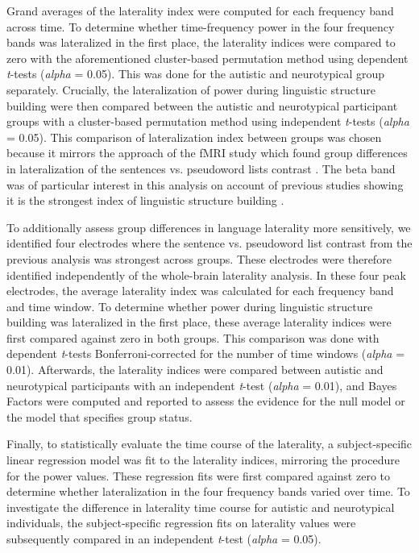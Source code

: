 Grand averages of the laterality index were computed for each frequency band across time. To determine whether time-frequency power in the four frequency bands was lateralized in the first place, the laterality indices were compared to zero with the aforementioned cluster-based permutation method using dependent \textit{t}-tests (\textit{alpha} = 0.05). This was done for the autistic and neurotypical group separately. Crucially, the lateralization of power during linguistic structure building were then compared between the autistic and neurotypical participant groups with a cluster-based permutation method using independent \textit{t}-tests (\textit{alpha} = 0.05). This comparison of lateralization index between groups was chosen because it mirrors the approach of the fMRI study which found group differences in lateralization of the sentences vs. pseudoword lists contrast \citep{jouravlev2020}. The beta band was of particular interest in this analysis on account of previous studies showing it is the strongest index of linguistic structure building \citep{bastiaansen2010,bastiaansen2015}. 

To additionally assess group differences in language laterality more sensitively, we identified four electrodes where the sentence vs. pseudoword list contrast from the previous analysis was strongest across groups. These electrodes were therefore identified independently of the whole-brain laterality analysis. In these four peak electrodes, the average laterality index was calculated for each frequency band and time window. To determine whether power during linguistic structure building was lateralized in the first place, these average laterality indices were first compared against zero in both groups. This comparison was done with dependent \textit{t}-tests Bonferroni-corrected for the number of time windows (\textit{alpha} = 0.01). Afterwards, the laterality indices were compared between autistic and neurotypical participants with an independent \textit{t}-test (\textit{alpha} = 0.01), and Bayes Factors were computed and reported to assess the evidence for the null model or the model that specifies group status.

Finally, to statistically evaluate the time course of the laterality, a subject-specific linear regression model was fit to the laterality indices, mirroring the procedure for the power values. These regression fits were first compared against zero to determine whether lateralization in the four frequency bands varied over time. To investigate the difference in laterality time course for autistic and neurotypical individuals, the subject-specific regression fits on laterality values were subsequently compared in an independent \textit{t}-test (\textit{alpha} = 0.05). 

